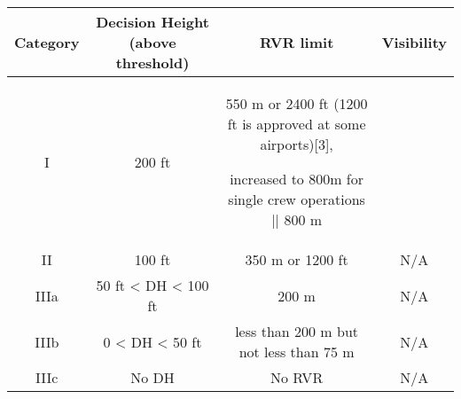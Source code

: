 \begin{tabular}{|c|c|c|c|} \hline
Category & Decision Height (above threshold)& 	RVR limit &	Visibility \\ \hline
I &	200 ft 	& 550 m or 2400 ft (1200 ft is approved at some airports)[3],

increased to 800m for single crew operations || 800 m & \\ \hline
II &	100 ft & 350 m or 1200 ft &	 N/A \\ \hline
IIIa &	50 ft < DH < 100 ft &	200 m &	N/A \\ \hline
IIIb &	0 < DH < 50 ft & less than 200 m but not less than 75 m & N/A \\ \hline
IIIc &	No DH &	No RVR & N/A \\ \hline
\end{tabular}
